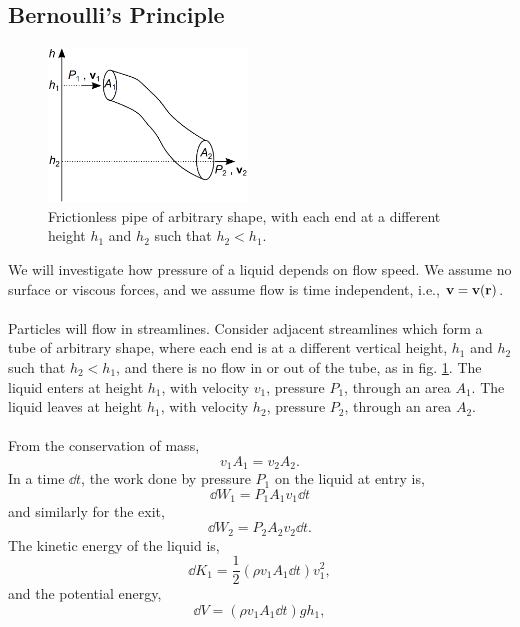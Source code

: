 \documentclass{book}
\begin{document}
\subsection{Bernoulli's Principle}
\begin{figure}
	\centering
	\includegraphics[width=200px]{bernouli.png}
	\caption{Frictionless pipe of arbitrary shape, with each end at a different height $h_1$ and $h_2$ such that $h_2 < h_1$.} \label{fig:bernoulli}
\end{figure}
We will investigate how pressure of a liquid depends on flow speed. We assume no surface or viscous forces, and we assume flow is time independent, i.e., $\vb{v} = \vb{v}(\vb{r})$.\\\\
Particles will flow in streamlines. Consider adjacent streamlines which form a tube of arbitrary shape, where each end is at a different vertical height, $h_1$ and $h_2$ such that $h_2 < h_1$, and there is no flow in or out of the tube, as in fig. \ref{fig:bernoulli}. The liquid enters at height $h_1$, with velocity $v_1$, pressure $P_1$, through an area $A_1$. The liquid leaves at height $h_1$, with velocity $h_2$, pressure $P_2$, through an area $A_2$.
\\\\
From the conservation of mass,
\begin{equation}
	v_1A_1 = v_2A_2. \label{eq:consofmass}
\end{equation}
In a time $\dd{t}$, the work done by pressure $P_1$ on the liquid at entry is,
\begin{equation}
	\dd{W}_1 = P_1A_1v_1\dd{t}
\end{equation}
and similarly for the exit,
\begin{equation}
	\dd{W}_2 = P_2A_2v_2\dd{t}.
\end{equation}
The kinetic energy of the liquid is,
\begin{equation}
	\dd{K}_1 = \frac{1}{2}\left(\rho v_1A_1 \dd{t}\right)v_1^2,
\end{equation}
and the potential energy,
\begin{equation}
	\dd{V} = \left(\rho v_1A_1\dd{t}\right)gh_1,
\end{equation}
\end{document}
